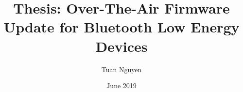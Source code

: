 \documentclass[11pt,a4paper]{article}
\begin{document}
\title{Thesis: Over-The-Air Firmware Update for Bluetooth Low Energy Devices}
\author{Tuan Nguyen}
\date{June 2019}
\maketitle
\newpage

\tableofcontents
\newpage


\newpage


\newpage


\newpage


\newpage


\newpage


\newpage


\end{document}
